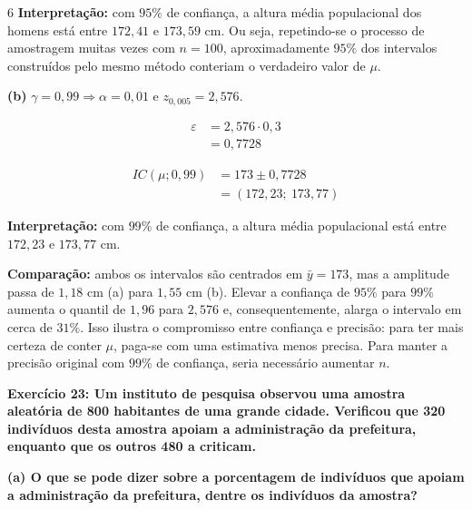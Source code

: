\documentclass[8pt, a4paper, landscape]{extarticle}
\begin{document}
\begin{multicols}{6}
\textbf{Interpretação:} com $95\%$ de confiança, a altura média populacional dos homens está entre $172,41$ e $173,59$ cm. Ou seja, repetindo-se o processo de amostragem muitas vezes com $n = 100$, aproximadamente $95\%$ dos intervalos construídos pelo mesmo método conteriam o verdadeiro valor de $\mu$.

\vspace{0.2cm}

\textbf{(b)} $\gamma = 0,99 \Rightarrow \alpha = 0,01$ e $z_{0,005} = 2,576$.

\begin{equation*}
\begin{split}
\varepsilon &= 2,576 \cdot 0,3 \\
&= 0,7728
\end{split}
\end{equation*}

\begin{equation*}
\begin{split}
IC(\mu;0,99) &= 173 \pm 0,7728 \\
&= (172,23;\ 173,77)
\end{split}
\end{equation*}

\textbf{Interpretação:} com $99\%$ de confiança, a altura média populacional está entre $172,23$ e $173,77$ cm.

\vspace{0.2cm}

\textbf{Comparação:} ambos os intervalos são centrados em $\bar{y} = 173$, mas a amplitude passa de $1,18$ cm (a) para $1,55$ cm (b). Elevar a confiança de $95\%$ para $99\%$ aumenta o quantil de $1,96$ para $2,576$ e, consequentemente, alarga o intervalo em cerca de $31\%$. Isso ilustra o compromisso entre confiança e precisão: para ter mais certeza de conter $\mu$, paga-se com uma estimativa menos precisa. Para manter a precisão original com $99\%$ de confiança, seria necessário aumentar $n$.

\textbf{Exercício 23: Um instituto de pesquisa observou uma amostra aleatória de 800 habitantes de uma grande cidade. Verificou que 320 indivíduos desta amostra apoiam a administração da prefeitura, enquanto que os outros 480 a criticam.}

\textbf{(a) O que se pode dizer sobre a porcentagem de indivíduos que apoiam a administração da prefeitura, dentre os indivíduos da amostra?}


\end{multicols}
\end{document}
